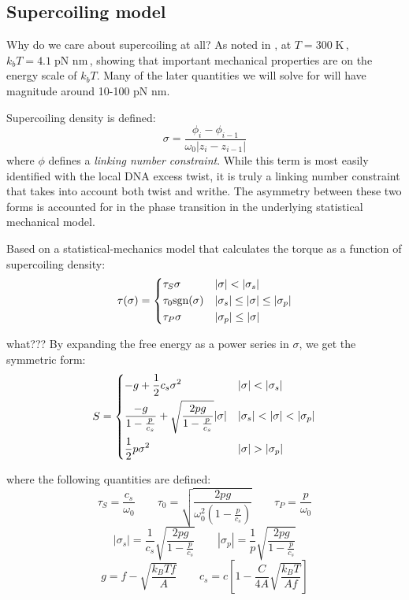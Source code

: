 \documentclass[11pt]{article}
\newcommand{\unit}[1]{\; \text{#1}\,}
\begin{document}
\subsection{Supercoiling model}
Why do we care about supercoiling at all? As noted in \textcite{markoTorqueDynamicsLinking2007}, at \(T = 300 \unit{K}\), \(k_b T = 4.1 \unit{pN nm}\), showing that
important mechanical properties are on the energy scale of \(k_b T\). Many of the later quantities we will solve for will have magnitude around 10-100 pN nm.

Supercoiling density is defined:
\begin{equation}
    \sigma = \frac{\phi_i - \phi_{i - 1}}{\omega_0 | z_{i} - z_{i-1}|}
    \label{eq:sc_density}
\end{equation}
where \(\phi\) defines a \emph{linking number constraint}. While this term is most easily identified with the local DNA excess twist, it is truly a linking number constraint that takes into account both twist and writhe. The asymmetry between these two forms is accounted for in the phase transition in the underlying statistical mechanical model.

Based on a statistical-mechanics model that calculates the torque as a function of supercoiling density:
\begin{equation}
    \tau(\sigma) = \begin{dcases} \tau_S \sigma & |\sigma| < |\sigma_s| \\ \tau_0 \text{sgn}(\sigma) & |\sigma_s| \leq |\sigma | \leq |\sigma_p| \\ \tau_P \sigma & |\sigma_p| \leq |\sigma|\end{dcases}
\end{equation}

what???
By expanding the free energy as a power series in \(\sigma\), we get the symmetric form:
\begin{equation}
    S = \begin{dcases}
        -g + \frac{1}{2} c_s \sigma^2 & |\sigma| < |\sigma_s| \\
        \frac{-g}{1 - \frac{p}{c_s}} + \sqrt{\frac{2 p g}{1 - \frac{p}{c_s}}} |\sigma| & |\sigma_s| < |\sigma| < |\sigma_p| \\
        \frac{1}{2} p \sigma^2 & |\sigma| > |\sigma_p|
    \end{dcases}
\end{equation}

where the following quantities are defined:
\[\tau_S = \frac{c_s}{\omega_0} \qquad \tau_0 = \sqrt{\frac{2 pg}{\omega_0^2 \left(1 - \frac{p}{c_s}\right)}} \qquad \tau_P = \frac{p}{\omega_0} \]
\[|\sigma_s| = \frac{1}{c_s} \sqrt{\frac{2pg}{1 - \frac{p}{c_s}}} \qquad |\sigma_p| = \frac{1}{p} \sqrt{\frac{2pg}{1 - \frac{p}{c_s}}}\]
\[g = f - \sqrt{\frac{k_B T f}{A}} \qquad c_s = c \left[1 - \frac{C}{4A} \sqrt{\frac{k_B T}{A f}}\right]\]
\end{document}
